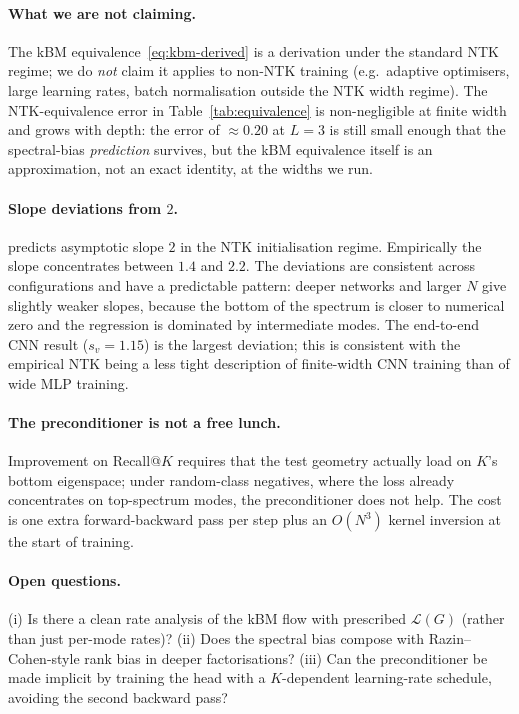 \documentclass[11pt]{article}
\theoremstyle{definition}
\theoremstyle{plain}
\begin{document}
\paragraph{What we are not claiming.}
The kBM equivalence~\eqref{eq:kbm-derived} is a derivation under the standard
NTK regime; we do \emph{not} claim it applies to non-NTK training (e.g.\
adaptive optimisers, large learning rates, batch normalisation outside the
NTK width regime). The NTK-equivalence error in
Table~\ref{tab:equivalence} is non-negligible at finite width and grows with
depth: the error of $\approx 0.20$ at $L=3$ is still small enough that the
spectral-bias \emph{prediction} survives, but the kBM equivalence itself is
an approximation, not an exact identity, at the widths we run.

\paragraph{Slope deviations from $2$.}
 predicts asymptotic slope $2$ in the NTK
initialisation regime. Empirically the slope concentrates between $1.4$ and
$2.2$. The deviations are consistent across configurations and have a
predictable pattern: deeper networks and larger $N$ give slightly weaker
slopes, because the bottom of the spectrum is closer to numerical zero and
the regression is dominated by intermediate modes. The end-to-end CNN result
($s_v=1.15$) is the largest deviation; this is consistent with the
empirical NTK being a less tight description of finite-width CNN training
than of wide MLP training.

\paragraph{The preconditioner is not a free lunch.}
Improvement on Recall@$K$ requires that the test geometry actually load on
$K$'s bottom eigenspace; under random-class negatives, where the loss
already concentrates on top-spectrum modes, the preconditioner does not
help. The cost is one extra forward-backward pass per step plus an
$O(N^3)$ kernel inversion at the start of training.

\paragraph{Open questions.}
(i) Is there a clean rate analysis of the kBM flow with prescribed
$\mathcal{L}(G)$ (rather than just per-mode rates)? (ii) Does the spectral
bias compose with Razin--Cohen-style rank bias in deeper factorisations?
(iii) Can the preconditioner be made implicit by training the head with a
$K$-dependent learning-rate schedule, avoiding the second backward pass?
\end{document}
